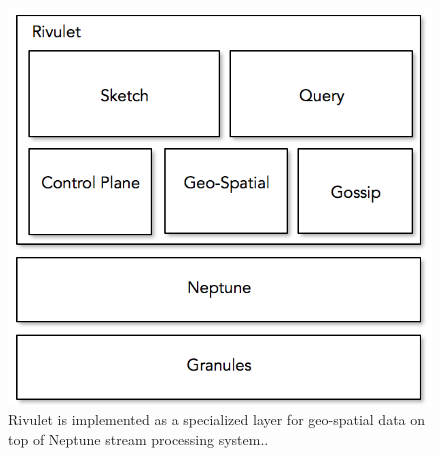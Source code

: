 \begin{figure}
    \centerline{\includegraphics[scale=0.5]{figures/rivulet-archi.png}}
    \caption{Rivulet is implemented as a specialized layer for geo-spatial data on top of Neptune stream processing system..}
    \label{fig:process-monitor}
\end{figure}
%
